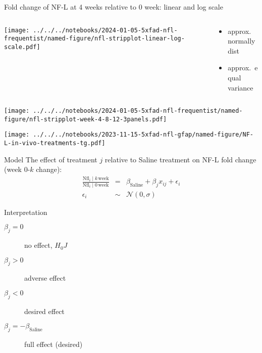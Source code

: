 \documentclass[aspectratio=169]{beamer}
\begin{document}
\begin{frame}{Fold change of NF-L at 4 weeks relative to 0 week: linear and log
  scale}
\begin{columns}[t]
\begin{column}{0.6\textwidth}
  
\texttt{[image: ../../../notebooks/2024-01-05-5xfad-nfl-frequentist/named-figure/nfl-stripplot-linear-log-scale.pdf]}
\end{column}

\begin{column}{0.4\textwidth}
\begin{itemize}
  \item approx.~normally dist
  \item approx.~equal variance
\end{itemize}
\end{column}
\end{columns}
\end{frame}

\begin{frame}[plain]{}
\texttt{[image: ../../../notebooks/2024-01-05-5xfad-nfl-frequentist/named-figure/nfl-stripplot-week-4-8-12-3panels.pdf]}

\texttt{[image: ../../../notebooks/2023-11-15-5xfad-nfl-gfap/named-figure/NF-L-in-vivo-treatments-tg.pdf]}
\end{frame}

\begin{frame}{Model}
  The effect of treatment $j$ relative to Saline treatment on NF-L fold change
  (week 0-$k$ change):
\begin{eqnarray}
  \frac{\mathrm{Nfl}_i \; | \; k \, \mathrm{week}}{\mathrm{Nfl}_i \; | \; 0 \,
  \mathrm{week}} &=& \beta_{\mathrm{Saline}} + \beta_{j} x_{ij} + \epsilon_i
  \\
  \epsilon_i &\sim& \mathcal{N}(0, \sigma)
\end{eqnarray}

Interpretation
\begin{description}
\item[$\beta_{j} = 0$] no effect, $H_0J$
\item[$\beta_{j} > 0$] adverse effect
\item[$\beta_{j} < 0$] desired effect
\item[$\beta_{j} = - \beta_{\mathrm{Saline}}$] full effect (desired)
\end{description}
\end{frame}
\end{document}
